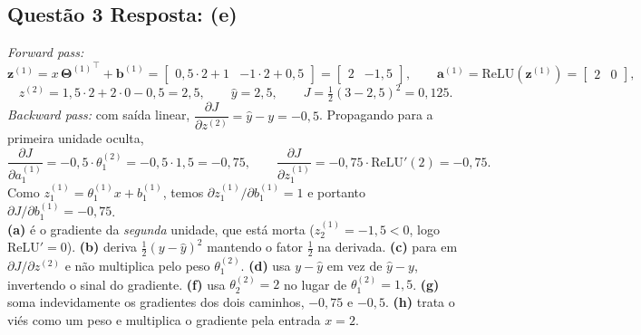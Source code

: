 \documentclass[11pt,a4paper]{article}
\begin{document}
\subsection*{Questão 3 \textemdash{} Resposta: (e)}
\textit{Forward pass:}
\[
\mathbf{z}^{(1)} = x\,{\mathbf{\Theta}^{(1)}}^{\top} + \mathbf{b}^{(1)}
= \begin{bmatrix} 0{,}5 \cdot 2 + 1 & -1 \cdot 2 + 0{,}5 \end{bmatrix} = \begin{bmatrix} 2 & -1{,}5 \end{bmatrix},
\qquad
\mathbf{a}^{(1)} = \mathrm{ReLU}(\mathbf{z}^{(1)}) = \begin{bmatrix} 2 & 0 \end{bmatrix},
\]
\[
z^{(2)} = 1{,}5 \cdot 2 + 2 \cdot 0 - 0{,}5 = 2{,}5, \qquad \hat{y} = 2{,}5, \qquad J = \tfrac{1}{2}(3 - 2{,}5)^2 = 0{,}125 .
\]
\textit{Backward pass:} com saída linear, $\dfrac{\partial J}{\partial z^{(2)}} = \hat{y} - y = -0{,}5$. Propagando para a primeira unidade oculta,
\[
\frac{\partial J}{\partial a^{(1)}_1} = -0{,}5 \cdot \theta^{(2)}_1 = -0{,}5 \cdot 1{,}5 = -0{,}75,
\qquad
\frac{\partial J}{\partial z^{(1)}_1} = -0{,}75 \cdot \mathrm{ReLU}'(2) = -0{,}75 .
\]
Como $z^{(1)}_1 = \theta^{(1)}_1 x + b^{(1)}_1$, temos $\partial z^{(1)}_1 / \partial b^{(1)}_1 = 1$ e portanto $\partial J / \partial b^{(1)}_1 = -0{,}75$.\\
\textbf{(a)} é o gradiente da \emph{segunda} unidade, que está morta ($z^{(1)}_2 = -1{,}5 < 0$, logo $\mathrm{ReLU}' = 0$).
\textbf{(b)} deriva $\tfrac{1}{2}(y - \hat{y})^2$ mantendo o fator $\tfrac{1}{2}$ na derivada.
\textbf{(c)} para em $\partial J / \partial z^{(2)}$ e não multiplica pelo peso $\theta^{(2)}_1$.
\textbf{(d)} usa $y - \hat{y}$ em vez de $\hat{y} - y$, invertendo o sinal do gradiente.
\textbf{(f)} usa $\theta^{(2)}_2 = 2$ no lugar de $\theta^{(2)}_1 = 1{,}5$.
\textbf{(g)} soma indevidamente os gradientes dos dois caminhos, $-0{,}75$ e $-0{,}5$.
\textbf{(h)} trata o viés como um peso e multiplica o gradiente pela entrada $x = 2$.
\end{document}
